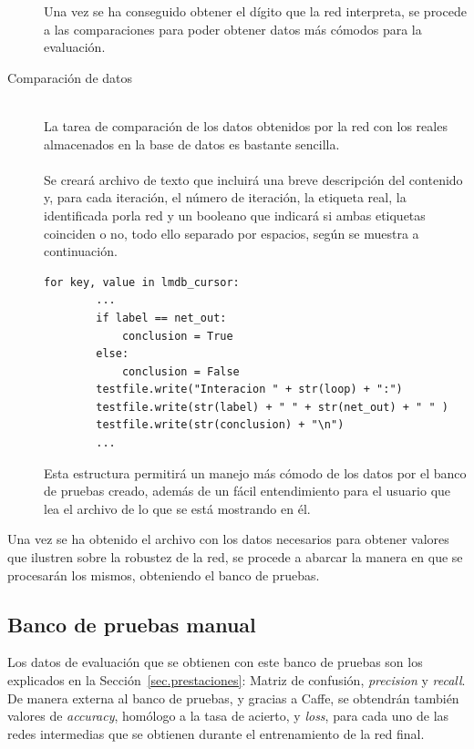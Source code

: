 \begin{description}
	Una vez se ha conseguido obtener el dígito que la red interpreta, se procede a las comparaciones para poder obtener datos más cómodos para la evaluación.
	\vspace{5pt}
	\item[Comparación de datos] \hfill 
	\vspace{5pt}
	\\
	La tarea de comparación de los datos obtenidos por la red con los reales almacenados en la base de datos es bastante sencilla. \\
	\vspace{-10pt}
	\\
	Se creará archivo de texto que incluirá una breve descripción del contenido y, para cada iteración, el número de iteración, la etiqueta real, la identificada porla red y un booleano que indicará si ambas etiquetas coinciden o no, todo ello separado por espacios, según se muestra a continuación.
	\vspace{10pt}
	\begin{lstlisting}[frame=single]
	for key, value in lmdb_cursor:
		...
		if label == net_out:
			conclusion = True
		else:
			conclusion = False
		testfile.write("Interacion " + str(loop) + ":")
		testfile.write(str(label) + " " + str(net_out) + " " )
		testfile.write(str(conclusion) + "\n")
		...
	\end{lstlisting}
	
	Esta estructura permitirá un manejo más cómodo de los datos por el banco de pruebas creado, además de un fácil entendimiento para el usuario que lea el archivo de lo que se está mostrando en él.
\end{description}

Una vez se ha obtenido el archivo con los datos necesarios para obtener valores que ilustren sobre la robustez de la red, se procede a abarcar la manera en que se procesarán los mismos, obteniendo el banco de pruebas.

\subsection{Banco de pruebas manual}
Los datos de evaluación que se obtienen con este banco de pruebas son los explicados en la Sección~\ref{sec.prestaciones}: Matriz de confusión, \textit{precision} y \textit{recall}. De manera externa al banco de pruebas, y gracias a Caffe, se obtendrán también valores de \textit{accuracy}, homólogo a la tasa de acierto, y \textit{loss}, para cada uno de las redes intermedias que se obtienen durante el entrenamiento de la red final.\\

